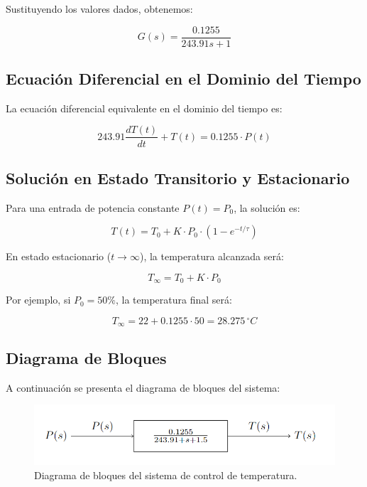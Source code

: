 \documentclass[spanish, a4paper, 11pt]{article}
\begin{document}
Sustituyendo los valores dados, obtenemos:

\begin{equation}
    G(s) = \frac{0.1255}{243.91 s + 1}
\end{equation}

\subsection{Ecuación Diferencial en el Dominio del Tiempo}

La ecuación diferencial equivalente en el dominio del tiempo es:

\begin{equation}
    243.91 \frac{dT(t)}{dt} + T(t) = 0.1255 \cdot P(t)
\end{equation}

\subsection{Solución en Estado Transitorio y Estacionario}

Para una entrada de potencia constante \(P(t) = P_0\), la solución es:

\begin{equation}
    T(t) = T_0 + K \cdot P_0 \cdot \left(1 - e^{-t/\tau}\right)
\end{equation}

En estado estacionario (\(t \to \infty\)), la temperatura alcanzada será:

\begin{equation}
    T_{\infty} = T_0 + K \cdot P_0
\end{equation}

Por ejemplo, si \(P_0 = 50\%\), la temperatura final será:

\begin{equation}
    T_{\infty} = 22 + 0.1255 \cdot 50 = 28.275 \, ^\circ C
\end{equation}

\subsection{Diagrama de Bloques}

A continuación se presenta el diagrama de bloques del sistema:

\begin{figure}[ht]
    \centering
    \includegraphics[width=1\textwidth]{./figures/DiagramaBloques.png}
    \caption{Diagrama de bloques del sistema de control de temperatura.}
\end{figure}
\FloatBarrier
\end{document}

